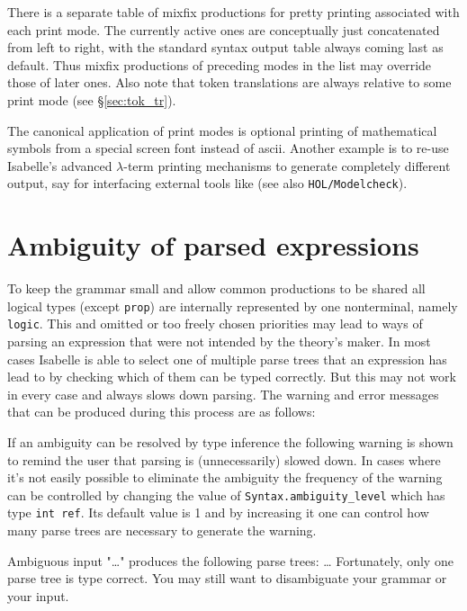 There is a separate table of mixfix productions for pretty printing
associated with each print mode.  The currently active ones are
conceptually just concatenated from left to right, with the standard
syntax output table always coming last as default.  Thus mixfix
productions of preceding modes in the list may override those of later
ones.  Also note that token translations are always relative to some
print mode (see \S\ref{sec:tok_tr}).

\medskip The canonical application of print modes is optional printing
of mathematical symbols from a special screen font instead of {\sc
  ascii}.  Another example is to re-use Isabelle's advanced
$\lambda$-term printing mechanisms to generate completely different
output, say for interfacing external tools like  (see also \texttt{HOL/Modelcheck}).



\section{Ambiguity of parsed expressions} \label{sec:ambiguity}

To keep the grammar small and allow common productions to be shared
all logical types (except {\tt prop}) are internally represented
by one nonterminal, namely {\tt logic}.  This and omitted or too freely
chosen priorities may lead to ways of parsing an expression that were
not intended by the theory's maker.  In most cases Isabelle is able to
select one of multiple parse trees that an expression has lead
to by checking which of them can be typed correctly.  But this may not
work in every case and always slows down parsing.
The warning and error messages that can be produced during this process are
as follows:

If an ambiguity can be resolved by type inference the following
warning is shown to remind the user that parsing is (unnecessarily)
slowed down.  In cases where it's not easily possible to eliminate the
ambiguity the frequency of the warning can be controlled by changing
the value of {\tt Syntax.ambiguity_level} which has type {\tt int
ref}.  Its default value is 1 and by increasing it one can control how
many parse trees are necessary to generate the warning.

\begin{ttbox}
{\out Ambiguous input "\dots"}
{\out produces the following parse trees:}
{\out \dots}
{\out Fortunately, only one parse tree is type correct.}
{\out You may still want to disambiguate your grammar or your input.}
\end{ttbox}

